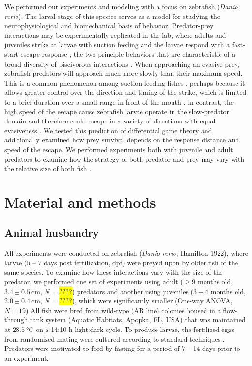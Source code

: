 \documentclass[]{rsos}%
\begin{document}
We performed our experiments and modeling with a focus on zebrafish (\textit{Danio rerio}). 
The larval stage of this species serves as a model for studying the neurophysiological \cite{Bianco:2015gm,Bagnall:2014iu,Huang:2013vj,} and biomechanical \cite{Muller:2004hp,Li:2016cy} basis of behavior.
Predator-prey interactions may be experimentally replicated in the lab, where adults and juveniles strike at larvae with suction feeding and the larvae respond with a fast-start escape response \cite{Stewart:2013bha}, the two principle behaviors that are characteristic of a broad diversity of piscivorous interactions \cite{Weihs:1984tb,Walker:2005vn,Higham:2007go,Higham:2005iu}. 
When approaching an evasive prey, zebrafish predators will approach much more slowly than their maximum speed.
This is a common phenomenon among suction-feeding fishes \cite{Higham:2005iu,Higham:2007go}, perhaps because it allows greater control over the direction and timing of the strike, which is limited to a brief duration over a small range in front of the mouth \cite{Holzman:2008jc,Holzman:2009uu}. 
In contrast, the high speed of the escape cause zebrafish larvae operate in the slow-predator domain and therefore could escape in a variety of directions with equal evasiveness \cite{Soto:2015cj}.
We tested this prediction of differential game theory and additionally examined how prey survival depends on the response distance and speed of the escape.  
We performed experiments both with juvenile and adult predators to examine how the strategy of both predator and prey may vary with the relative size of both fish \cite{Fuiman:1994td}.


\section{Material and methods}

\subsection{Animal husbandry}
All experiments were conducted on zebrafish (\textit{Danio rerio}, Hamilton 1922), where larvae (5 -- 7 days post fertilization, dpf) were preyed upon by older fish of the same species. 
To examine how these interactions vary with the size of the predator, we performed one set of experiments using adult ($\geq 9$ months old, $3.4 \pm \SI{0.5}{\cm}$, \textit{N} = \hl{????}) predators and another using juveniles ($3-4$ months old, $2.0  \pm  \SI{0.4}{\cm}$, \textit{N} = \hl{????}), which were significantly smaller (One-way ANOVA, $\textit{N} = 19$)
All fish were bred from wild-type (AB line) colonies housed in a flow-through tank system (Aquatic Habitats, Apopka, FL, USA) that was maintained at $\SI{28.5}{\celsius}$ on a 14:10 h light:dark cycle. 
To produce larvae, the fertilized eggs from randomized mating were cultured according to standard techniques \cite{Westerfield:UXiBrEuA}.
Predators were motivated to feed by fasting for a period of 7 -- 14 days prior to an experiment.
\end{document}
